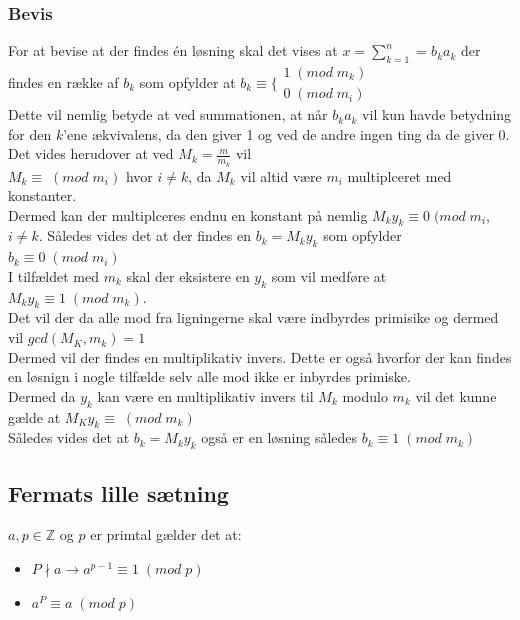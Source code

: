 \documentclass[12pt, a4paper]{article}
\begin{document}
			\subsubsection{Bevis}
			For at bevise at der findes én løsning skal det vises at $x=\sum\limits_{k=1}^n=b_ka_k$ der findes en række af $b_k$ som opfylder at  $b_k\equiv\Bigg\{\begin{matrix}1\;(mod\;m_k)\\0\;(mod\; m_i)\end{matrix}$\\
				Dette vil nemlig betyde at ved summationen, at når $b_ka_k$ vil kun havde betydning for den $k$'ene ækvivalens, da den giver 1 og ved de andre ingen ting da de giver 0.\\
				Det vides herudover at ved $M_k=\frac{m}{m_k}$ vil \\
				$M_k\equiv \;(mod\;m_i)$ hvor $i\neq k$, da $M_k$ vil altid være $m_i$ multiplceret med konstanter.\\
				Dermed kan der multiplceres endnu en konstant på nemlig $M_ky_k\equiv 0\;(mod\;m_i$, $i\neq k$. Således vides det at der findes en $b_k=M_ky_k$ som opfylder $b_k\equiv 0\;(mod\;m_i)$\\
				I tilfældet med $m_k$ skal der eksistere en $y_k$ som vil medføre at $M_ky_k\equiv 1\;(mod\;m_k)$.\\
				Det vil der da alle mod fra ligningerne skal være indbyrdes primisike og dermed vil $gcd(M_K,m_k)=1$\\
				Dermed vil der findes en multiplikativ invers. Dette er også hvorfor der kan findes en løsnign i nogle tilfælde selv alle mod ikke er inbyrdes primiske.\\
				Dermed da $y_k$ kan være en multiplikativ invers til $M_k$ modulo $m_k$ vil det kunne gælde at $M_Ky_k\equiv\;(mod\;m_k)$\\
				Således vides det at $b_k=M_ky_k$ også er en løsning således $b_k\equiv 1 \;(mod\;m_k)$\\
			\subsection{Fermats lille sætning}
				$a,p\in \mathbb{Z}$ og $p$ er primtal gælder det at:\\
				\begin{itemize}
					\item $P\nmid a\rightarrow a^{p-1}\equiv 1\;(mod\;p)$
					\item $a^P\equiv a\;(mod\;p)$
				\end{itemize}
\end{document}

